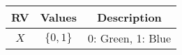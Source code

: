 
\begin{center}
\begin{tabular}{|c|c|c|}
\hline
\textbf{RV}& \textbf{Values} & \textbf{Description} \\ \hline
$X$ 		   & 	$\{0,1\}$	&	0: Green, 1: Blue\\ \hline
\end{tabular}
\end{center}
